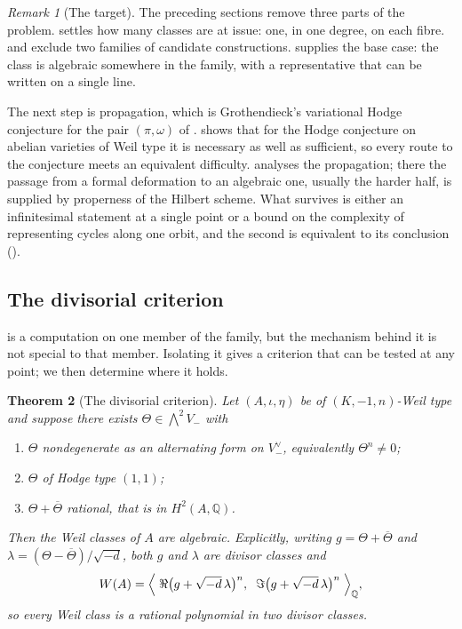 \documentclass[11pt,reqno]{amsart}
\theoremstyle{plain}
\newtheorem{theorem}{Theorem}[section]
\theoremstyle{definition}
\theoremstyle{remark}
\newtheorem{remark}[theorem]{Remark}
\newcommand{\QQ}{\mathbb{Q}}
\newcommand{\HW}{W}                      %
\newcommand{\bbar}[1]{\overline{#1}}
\begin{document}
\begin{remark}[The target]\label{rem:target}
The preceding sections remove three parts of the problem.
 settles how many classes are at issue: one, in one
degree, on each fibre.  and  exclude
two families of candidate constructions.  supplies the
base case: the class is algebraic somewhere in the family, with a
representative that can be written on a single line.

The next step is propagation, which is Grothendieck's variational Hodge
conjecture for the pair $(\pi,\omega)$ of .
 shows that for the Hodge conjecture on
abelian varieties of Weil type it is necessary as well as sufficient, so every
route to the conjecture meets an equivalent difficulty.
 analyses the propagation; there the passage from a
formal deformation to an algebraic one, usually the harder half, is supplied
by properness of the Hilbert scheme. What survives is either an infinitesimal
statement at a single point or a bound on the complexity of representing
cycles along one orbit, and the second is equivalent to its conclusion
().
\end{remark}

\subsection{The divisorial criterion}
\label{ssec:divcrit}

 is a computation on one member of the family, but the
mechanism behind it is not special to that member. Isolating it gives a
criterion that can be tested at any point; we then determine where it holds.

\begin{theorem}[The divisorial criterion]\label{thm:divcriterion}
Let $(A,\iota,\eta)$ be of $(K,-1,n)$-Weil type and suppose there exists
$\Theta\in\bigwedge^{2}V_{-}$ with
\begin{enumerate}[label=\textup{(\roman*)},nosep]
\item $\Theta$ nondegenerate as an alternating form on $V_{-}^{\vee}$,
  equivalently $\Theta^{n}\ne0$;
\item $\Theta$ of Hodge type $(1,1)$;
\item $\Theta+\bbar{\Theta}$ rational, that is in $H^{2}(A,\QQ)$.
\end{enumerate}
Then the Weil classes of $A$ are algebraic. Explicitly, writing
$g=\Theta+\bbar{\Theta}$ and $\lambda=(\Theta-\bbar{\Theta})/\sqrt{-d}$, both
$g$ and $\lambda$ are divisor classes and
\begin{equation}\label{eq:divrep}
  \HW(A)=\Bigl\langle\;
    \Re\bigl(g+\sqrt{-d}\,\lambda\bigr)^{n},\;\;
    \Im\bigl(g+\sqrt{-d}\,\lambda\bigr)^{n}\;\Bigr\rangle_{\QQ},
\end{equation}
so every Weil class is a rational polynomial in two divisor classes.
\end{theorem}
\end{document}
